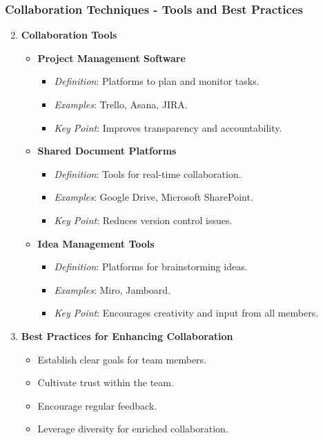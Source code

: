 \documentclass[aspectratio=169]{beamer}
\begin{document}
\begin{frame}[fragile]
    \frametitle{Collaboration Techniques - Tools and Best Practices}
    \begin{enumerate}
        \setcounter{enumi}{1}
        \item \textbf{Collaboration Tools}
        \begin{itemize}
            \item \textbf{Project Management Software}
            \begin{itemize}
                \item \textit{Definition}: Platforms to plan and monitor tasks.
                \item \textit{Examples}: Trello, Asana, JIRA.
                \item \textit{Key Point}: Improves transparency and accountability.
            \end{itemize}
            \item \textbf{Shared Document Platforms}
            \begin{itemize}
                \item \textit{Definition}: Tools for real-time collaboration.
                \item \textit{Examples}: Google Drive, Microsoft SharePoint.
                \item \textit{Key Point}: Reduces version control issues.
            \end{itemize}
            \item \textbf{Idea Management Tools}
            \begin{itemize}
                \item \textit{Definition}: Platforms for brainstorming ideas.
                \item \textit{Examples}: Miro, Jamboard.
                \item \textit{Key Point}: Encourages creativity and input from all members.
            \end{itemize}
        \end{itemize}

        \item \textbf{Best Practices for Enhancing Collaboration}
        \begin{itemize}
            \item Establish clear goals for team members.
            \item Cultivate trust within the team.
            \item Encourage regular feedback.
            \item Leverage diversity for enriched collaboration.
        \end{itemize}
    \end{enumerate}
\end{frame}
\end{document}
